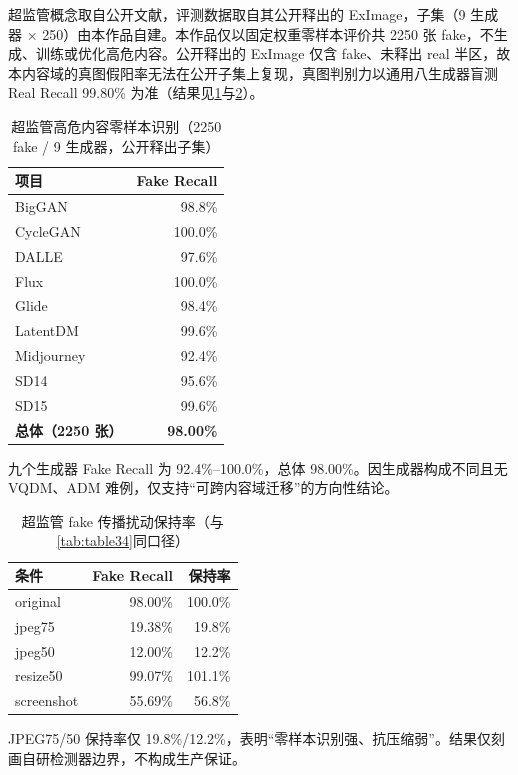 \documentclass[UTF8, a4paper, 12pt]{ctexart}
\begin{document}
超监管概念取自公开文献\cite{mu2025exda}，评测数据取自其公开释出的 ExImage，子集（9 生成器 × 250）由本作品自建。本作品仅以固定权重零样本评价共 2250 张 fake，不生成、训练或优化高危内容。公开释出的 ExImage 仅含 fake、未释出 real 半区，故本内容域的真图假阳率无法在公开子集上复现，真图判别力以通用八生成器盲测 Real Recall 99.80\% 为准（结果见\cref{tab:table36}与\cref{tab:table37}）。

\begin{table}[H]
\centering
\caption{超监管高危内容零样本识别（2250 fake / 9 生成器，公开释出子集）}
\label{tab:table36}
\begin{tabular}{@{}lr@{}}
\toprule
\textbf{项目} & \textbf{Fake Recall} \\
\midrule
BigGAN & 98.8\% \\
CycleGAN & 100.0\% \\
DALLE & 97.6\% \\
Flux & 100.0\% \\
Glide & 98.4\% \\
LatentDM & 99.6\% \\
Midjourney & 92.4\% \\
SD14 & 95.6\% \\
SD15 & 99.6\% \\
\midrule
\textbf{总体（2250 张）} & \textbf{98.00\%} \\
\bottomrule
\end{tabular}
\end{table}

九个生成器 Fake Recall 为 92.4\%--100.0\%，总体 98.00\%。因生成器构成不同且无 VQDM、ADM 难例，仅支持“可跨内容域迁移”的方向性结论。

\begin{table}[H]
\centering
\caption{超监管 fake 传播扰动保持率（与\cref{tab:table34}同口径）}
\label{tab:table37}
\begin{tabular}{@{}lrr@{}}
\toprule
\textbf{条件} & \textbf{Fake Recall} & \textbf{保持率} \\
\midrule
original & 98.00\% & 100.0\% \\
jpeg75 & 19.38\% & 19.8\% \\
jpeg50 & 12.00\% & 12.2\% \\
resize50 & 99.07\% & 101.1\% \\
screenshot & 55.69\% & 56.8\% \\
\bottomrule
\end{tabular}
\end{table}

JPEG75/50 保持率仅 19.8\%/12.2\%，表明“零样本识别强、抗压缩弱”。结果仅刻画自研检测器边界，不构成生产保证。
\end{document}
